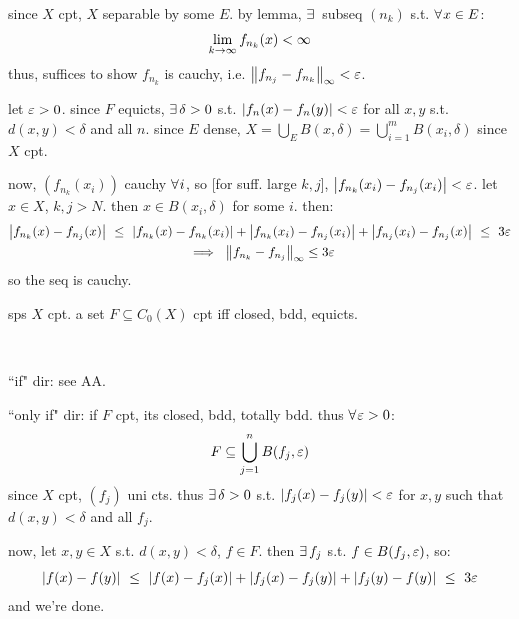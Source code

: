 since $X$ cpt, $X$ separable by some $E$. by lemma, $\ex$ subseq $(n_{k})$ s.t. $\fa x\in E$:
\begin{equation*}
	\lim_{k\rightarrow\infty}f_{n_{k}}(x)<\infty
\end{equation*}
thus, suffices to show $f_{n_{k}}$ is cauchy, i.e. $\left\|f_{n_{j}}-f_{n_{k}}\right\|_{\infty}<\varepsilon$.

let $\varepsilon>0$. since $F$ equicts, $\ex\delta>0$ s.t. $\abs{f_{n}(x)-f_{n}(y)}<\varepsilon$ for
all $x,y$ s.t. $d(x,y)<\delta$ and all $n$.
since $E$ dense, $X=\bigcup_{E}B(x,\delta)=\bigcup_{i=1}^{m}B(x_{i},\delta)$ since $X$ cpt.

now, $(f_{n_{k}}(x_{i}))$ cauchy $\fa i$, so [for suff. large $k,j$],
$\abs{f_{n_{k}}(x_{i})-f_{n_{j}}(x_{i})}<\varepsilon$.
let $x\in X$, $k,j>N$. then $x\in B(x_{i},\delta)$ for some $i$. then:
\begin{gather*}
	\abs{f_{n_{k}}(x)-f_{n_{j}}(x)}
	\ \leq \ \abs{f_{n_{k}}(x)-f_{n_{k}}(x_{i})}+\abs{f_{n_{k}}(x_{i})-f_{n_{j}}(x_{i})}
	+\abs{f_{n_{j}}(x_{i})-f_{n_{j}}(x)} \ \leq \ 3\ep \\
	\ \implies \ \norm{f_{n_{k}}-f_{n_{j}}}_{\infty}\leq3\ep
\end{gather*}
so the seq is cauchy.

\newpage
\begin{thm}
	sps $X$ cpt. a set $F\subseteq C_{0}(X)$ cpt iff closed, bdd, equicts.
\end{thm} \

\begin{pf}[source=Primary Source Material]
	``if" dir: see AA.

	``only if" dir: if $F$ cpt, its closed, bdd, totally bdd. thus $\fa\ep>0$:
	\begin{equation*}
		F\subseteq\bigcup_{j=1}^{n}B(f_{j},\varepsilon)
	\end{equation*}
	since $X$ cpt, $(f_{j})$ uni cts. thus $\ex\delta>0$ s.t. $\abs{f_{j}(x)-f_{j}(y)}<\varepsilon$
	for $x,y$ such that $d(x,y)<\delta$ and all $f_{j}$.

	now, let $x,y\in X$ s.t. $d(x,y)<\delta$, $f\in F$.
	then $\ex f_{j}$ s.t. $f\in B(f_{j},\varepsilon)$, so:
	\begin{equation*}
		\abs{f(x)-f(y)}
		\ \leq \ \abs{f(x)-f_{j}(x)}+\abs{f_{j}(x)-f_{j}(y)}+\abs{f_{j}(y)-f(y)}
		\ \leq \ 3\ep
	\end{equation*}
	and we're done.
\end{pf}



